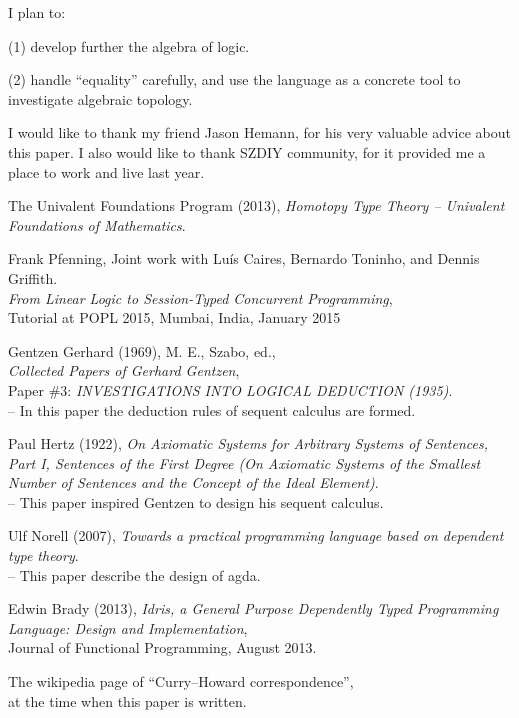 \documentclass[numbers]{sigplanconf}
\begin{document}
I plan to:

(1) develop further the algebra of logic.

(2) handle ``equality'' carefully,
and use the language as a concrete tool
to investigate algebraic topology.

\acks

I would like to thank my friend Jason Hemann, for his very valuable advice about this paper. I also would like to thank SZDIY community, for it provided me a place to work and live last year.

\newpage



\begin{thebibliography}{10}

  The Univalent Foundations Program (2013),
  \emph{Homotopy Type Theory -- Univalent Foundations of Mathematics}.

  Frank Pfenning, Joint work with Luís Caires, Bernardo Toninho, and Dennis Griffith. \\
  \emph{From Linear Logic to Session-Typed Concurrent Programming}, \\
  Tutorial at POPL 2015, Mumbai, India, January 2015

  Gentzen Gerhard (1969), M. E., Szabo, ed., \\
  \emph{Collected Papers of Gerhard Gentzen}, \\
  Paper \#3: \emph{INVESTIGATIONS INTO LOGICAL DEDUCTION (1935)}. \\
  -- In this paper the deduction rules of sequent calculus are formed.

  Paul Hertz (1922), \emph{On Axiomatic Systems for Arbitrary Systems of Sentences, Part I, Sentences of the First Degree (On Axiomatic Systems of the Smallest Number of Sentences and the Concept of the Ideal Element)}.\\
  -- This paper inspired Gentzen to design his sequent calculus.

  Ulf Norell (2007), \emph{Towards a practical programming language based on dependent type theory}. \\
  -- This paper describe the design of agda.

  Edwin Brady (2013), \emph{Idris, a General Purpose Dependently Typed Programming Language: Design and Implementation}, \\
  Journal of Functional Programming, August 2013.

  The wikipedia page of ``Curry--Howard correspondence'', \\
  at the time when this paper is written.

\end{thebibliography}
\end{document}
